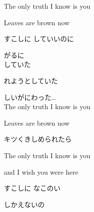 {The only truth I know is you

Leaves are brown now

すこしに していいのに

がるに
\\

していた

れようとしていた

しいがにわった…
\\

The only truth I know is you

Leaves are brown now

キツくきしめられたら

The only truth I know is you

and I wish you were here

すこしに なこのい

しかえないの

}